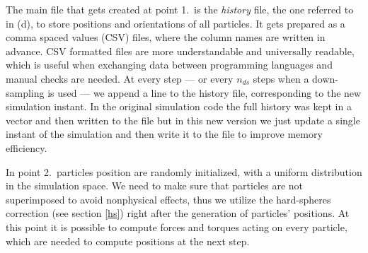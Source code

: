 \documentclass[../../master_thesis_np.tex]{subfiles}
\begin{document}
	The main file that gets created at point 1.\ is the \emph{history} file, the one referred to in (d), to store positions and orientations of all particles. 
	It gets prepared as a comma spaced values (CSV) files, where the column names are written in advance. 
	CSV formatted files are more understandable and universally readable, which is useful when exchanging data between programming languages and manual checks are needed.
	At every step --- or every $n_{ds}$ steps when a down-sampling is used --- we append a line to the history file, corresponding to the new simulation instant.
	In the original simulation code the full history was kept in a vector and then written to the file but in this new version we just update a single instant of the simulation and then write it to the file to improve memory efficiency.
	
	In point 2.\ particles position are randomly initialized, with a uniform distribution in the simulation space. 
	We need to make sure that particles are not superimposed to avoid nonphysical effects, thus we utilize the hard-spheres correction (see section \ref{hs}) right after the generation of particles' positions.%
	At this point it is possible to compute forces and torques acting on every particle, which are needed to compute positions at the next step.
	
\end{document}
